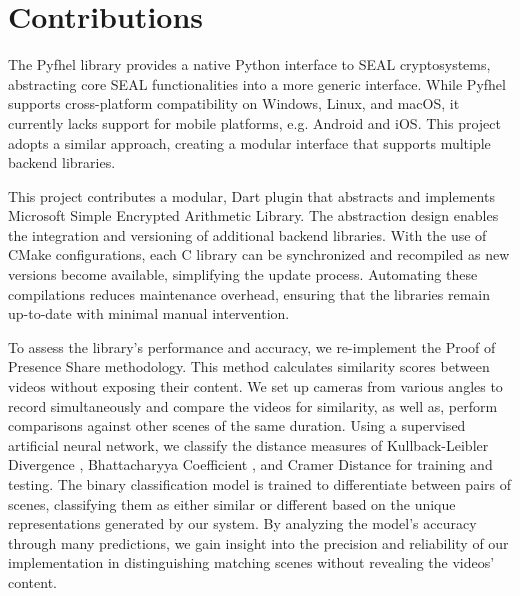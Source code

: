 \section{Contributions}
\label{sec:Contributions}
The Pyfhel library \cite{Ibarrondo2021-Pyfhel} provides a native Python interface to SEAL cryptosystems, abstracting core SEAL functionalities into a more generic interface. While Pyfhel supports cross-platform compatibility on Windows, Linux, and macOS, it currently lacks support for mobile platforms, e.g. Android and iOS. This project adopts a similar approach, creating a modular interface that supports multiple backend libraries.

This project contributes a modular, Dart plugin that abstracts and implements Microsoft Simple Encrypted Arithmetic Library. The abstraction design enables the integration and versioning of additional backend libraries. With the use of CMake configurations, each C library can be synchronized and recompiled as new versions become available, simplifying the update process. Automating these compilations reduces maintenance overhead, ensuring that the libraries remain up-to-date with minimal manual intervention.

To assess the library's performance and accuracy, we re-implement the Proof of Presence Share \cite{Lagesse2021-PopShare} methodology. This method calculates similarity scores between videos without exposing their content. We set up cameras from various angles to record simultaneously and compare the videos for similarity, as well as, perform comparisons against other scenes of the same duration. Using a supervised artificial neural network, we classify the distance measures of Kullback-Leibler Divergence \cite{Kullback1951-bg}, Bhattacharyya Coefficient \cite{Bhattacharyya1933-fw}, and Cramer Distance \cite{Cramer1928-sw} for training and testing. The binary classification model is trained to differentiate between pairs of scenes, classifying them as either similar or different based on the unique representations generated by our system. By analyzing the model’s accuracy through many predictions, we gain insight into the precision and reliability of our implementation in distinguishing matching scenes without revealing the videos’ content.
